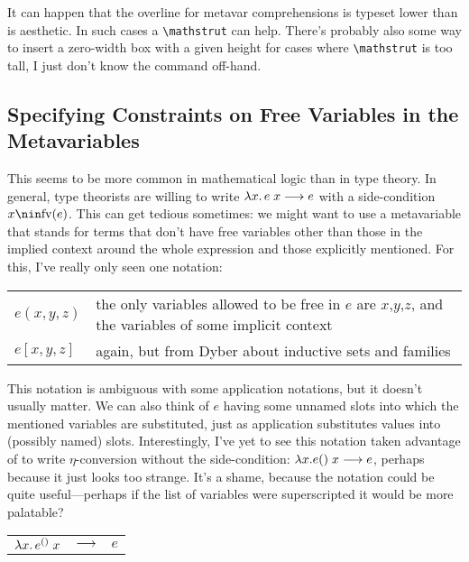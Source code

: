 \documentclass[11pt]{article} %
\theoremstyle{definition}
\theoremstyle{remark}
\begin{document}
It can happen that the overline for metavar comprehensions is typeset lower than is aesthetic.
In such cases a \verb!\mathstrut! can help.
There's probably also some way to insert a zero-width box with a given height for cases where \verb!\mathstrut! is too tall, I just don't know the command off-hand.

\subsection{Specifying Constraints on Free Variables in the Metavariables}

This seems to be more common in mathematical logic than in type theory.
In general, type theorists are willing to write ${\lambda}{x}.\,e\;x \longrightarrow e$ with a side-condition $x \nin \fv(e)$.
This can get tedious sometimes: we might want to use a metavariable that stands for terms that don't have free variables other than those in the implied context around the whole expression and those explicitly mentioned.
For this, I've really only seen one notation:
\begin{center}
\renewcommand{\arraystretch}{1.2}
\begin{tabular}{lp{10cm}}
$e(x, y, z)$ & the only variables allowed to be free in $e$ are $x$,$y$,$z$, and the variables of some implicit context \\
$e[x, y, z]$ & again, but from Dyber about inductive sets and families \\
\end{tabular}
\end{center}

This notation is ambiguous with some application notations, but it doesn't usually matter.
We can also think of $e$ having some unnamed slots into which the mentioned variables are substituted, just as application substitutes values into (possibly named) slots.
Interestingly, I've yet to see this notation taken advantage of to write $\eta$-conversion without the side-condition: $\lambda x.e()\;x \longrightarrow e$, perhaps because it just looks too strange.
It's a shame, because the notation could be quite useful---perhaps if the list of variables were superscripted it would be more palatable?
\begin{center}
\renewcommand{\arraystretch}{1.2}
\begin{tabular}{rcl}
${\lambda}{x}.\,e^{()}\;x$ & $\longrightarrow$ & $e$ \\
\end{tabular}
\end{center}
\end{document}

